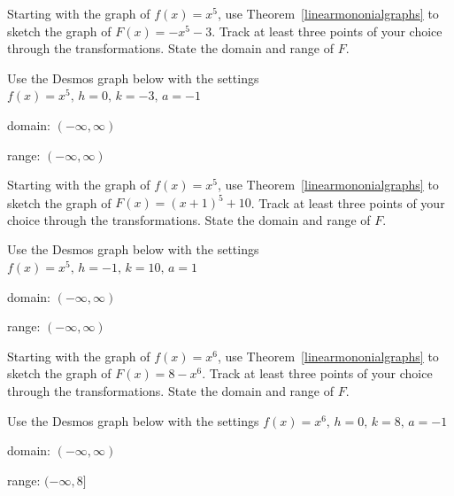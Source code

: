 \documentclass{ximera}
\begin{document}
\begin{problem}
     Starting with the graph of $f(x) = x^5$, use Theorem~\ref{linearmononialgraphs} to sketch the graph of $F(x) = -x^5 - 3$. Track at least three points of your choice through the transformations. State the domain and range of $F$.

\begin{solution}
Use the Desmos graph below with the settings $f(x)=x^5,\,h=0,\,k=-3,\,a=-1$

\begin{center} 
\end{center}

domain: $(-\infty, \infty)$

range: $(-\infty, \infty)$

\end{solution}
\end{problem}

\begin{problem}
     Starting with the graph of $f(x) = x^5$, use Theorem~\ref{linearmononialgraphs} to sketch the graph of $F(x) = (x + 1)^{5} + 10$. Track at least three points of your choice through the transformations. State the domain and range of $F$.

\begin{solution}
Use the Desmos graph below with the settings $f(x)=x^5,\,h=-1,\,k=10,\,a=1$

\begin{center} 
\end{center}


domain: $(-\infty, \infty)$

range: $(-\infty, \infty)$

\end{solution}
\end{problem}

\begin{problem}\label{polytranslast}
     Starting with the graph of $f(x) = x^6$, use Theorem~\ref{linearmononialgraphs} to sketch the graph of $F(x) = 8 - x^6$. Track at least three points of your choice through the transformations. State the domain and range of $F$.

\begin{solution}
Use the Desmos graph below with the settings $f(x)=x^6,\,h=0,\,k=8,\,a=-1$

\begin{center} 
\end{center}


domain: $(-\infty, \infty)$

range: $(-\infty, 8]$

\end{solution}
\end{problem}
\end{document}
